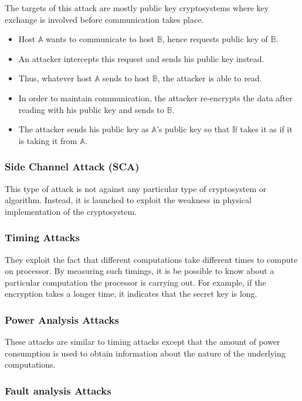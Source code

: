 \documentclass[british]{article}
\begin{document}
The targets of this attack are mostly public key cryptosystems where
key exchange is involved before communication takes place.
\begin{itemize}
\item Host $\mathbb{A}$ wants to communicate to host $\mathbb{B}$, hence
requests public key of $\mathbb{B}$.
\item An attacker intercepts this request and sends his public key instead.
\item Thus, whatever host $\mathbb{A}$ sends to host $\mathbb{B}$, the
attacker is able to read.
\item In order to maintain communication, the attacker re-encrypts the data
after reading with his public key and sends to $\mathbb{B}$.
\item The attacker sends his public key as $\mathbb{A}$\textquoteright s
public key so that $\mathbb{B}$ takes it as if it is taking it from
$\mathbb{A}$.
\end{itemize}

\subsubsection{Side Channel Attack (SCA)}

This type of attack is not against any particular type of cryptosystem
or algorithm. Instead, it is launched to exploit the weakness in physical
implementation of the cryptosystem.

\subsubsection{Timing Attacks}

They exploit the fact that different computations take different times
to compute on processor. By measuring such timings, it is be possible
to know about a particular computation the processor is carrying out.
For example, if the encryption takes a longer time, it indicates that
the secret key is long.

\subsubsection{Power Analysis Attacks}

These attacks are similar to timing attacks except that the amount
of power consumption is used to obtain information about the nature
of the underlying computations.

\subsubsection{Fault analysis Attacks}
\end{document}
